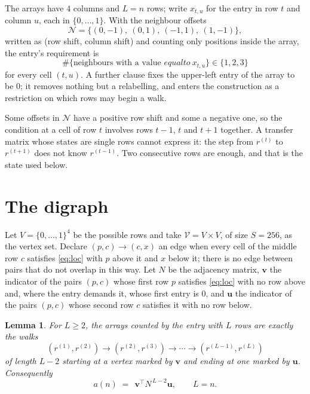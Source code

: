 \documentclass[11pt,a4paper]{article}
\theoremstyle{plain}
\newtheorem{lemma}[theorem]{Lemma}
\theoremstyle{definition}
\begin{document}
The arrays have $4$ columns and $L=n$ rows; write $x_{t,u}$ for the entry in
row $t$ and column $u$, each in $\{0,\dots,1\}$. With the neighbour offsets
\[
\mathcal N=\{(0,-1),\ (0,1),\ (-1,1),\ (1,-1)\},
\]
written as (row shift, column shift) and counting only positions inside the array, the
entry's requirement is
\begin{equation}\label{eq:loc}
\#\{\text{neighbours with a value }equal to\ x_{t,u}\}\in\{1,2,3\}
\end{equation}
for every cell $(t,u)$. A further clause fixes the upper-left entry of the array to be $0$; it removes nothing but a relabelling, and enters the construction as a restriction on which rows may begin a walk.

Some offsets in $\mathcal N$ have a positive row shift and some a negative one, so the
condition at a cell of row $t$ involves rows $t-1$, $t$ and $t+1$ together. A transfer
matrix whose states are single rows cannot express it: the step from $r^{(t)}$ to
$r^{(t+1)}$ does not know $r^{(t-1)}$. Two consecutive rows are enough, and that is
the state used below.

\section{The digraph}

Let $V=\{0,\dots,1\}^{4}$ be the possible rows and take
$\mathcal V=V\times V$, of size $S=256$, as the vertex set. Declare $(p,c)\to(c,x)$ an edge
when every cell of the middle row $c$ satisfies \eqref{eq:loc} with $p$ above it and $x$
below it; there is no edge between pairs that do not overlap in this way. Let $N$ be the
adjacency matrix, $\mathbf{v}$ the indicator of the pairs $(p,c)$ whose first row $p$
satisfies \eqref{eq:loc} with no row above and, where the entry demands it, whose first entry is $0$, and $\mathbf{u}$ the indicator of
the pairs $(p,c)$ whose second row $c$ satisfies it with no row below.

\begin{lemma}\label{lem:walk}
For $L\ge2$, the arrays counted by the entry with $L$ rows are exactly the walks
\[
(r^{(1)},r^{(2)})\to(r^{(2)},r^{(3)})\to\cdots\to(r^{(L-1)},r^{(L)})
\]
of length $L-2$ starting at a vertex marked by $\mathbf{v}$ and ending at one marked by
$\mathbf{u}$. Consequently
\[
a(n)\;=\;\,\mathbf{v}^{\!\top}N^{\,L-2}\mathbf{u},\qquad L=n .
\]
\end{lemma}
\end{document}
